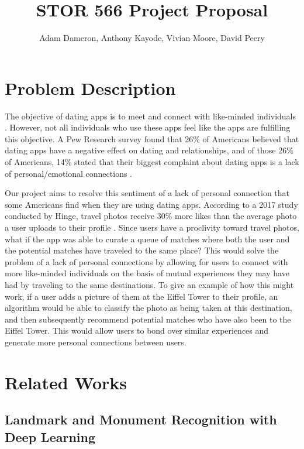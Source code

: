 \documentclass{article}
\title{STOR 566 Project Proposal}
\author{
	Adam Dameron, Anthony Kayode, Vivian Moore, David Peery
}
\begin{document}
	
\maketitle

\section*{Problem Description}

The objective of dating apps is to meet and connect with like-minded individuals \parencite{datingapps}. However, not all individuals who use these apps feel like the apps are fulfilling this objective. A Pew Research survey found that 26\% of Americans believed that dating apps have a negative effect on dating and relationships, and of those 26\% of Americans, 14\% stated that their biggest complaint about dating apps is a lack of personal/emotional connections \parencite{dating}. 


Our project aims to resolve this sentiment of a lack of personal connection that some Americans find when they are using dating apps. According to a 2017 study conducted by Hinge, travel photos receive 30\% more likes than the average photo a user uploads to their profile \parencite{lust}. Since users have a proclivity toward travel photos, what if the app was able to curate a queue of matches where both the user and the potential matches have traveled to the same place? This would solve the problem of a lack of personal connections by allowing for users to connect with more like-minded individuals on the basis of mutual experiences they may have had by traveling to the same destinations.
To give an example of how this might work, if a user adds a picture of them at the Eiffel Tower to their profile, an algorithm would be able to classify the photo as being taken at this destination, and then subsequently recommend potential matches who have also been to the Eiffel Tower. This would allow users to bond over similar experiences and generate more personal connections between users.


\section*{Related Works}

\subsection*{Landmark and Monument Recognition with Deep Learning }
\end{document}
